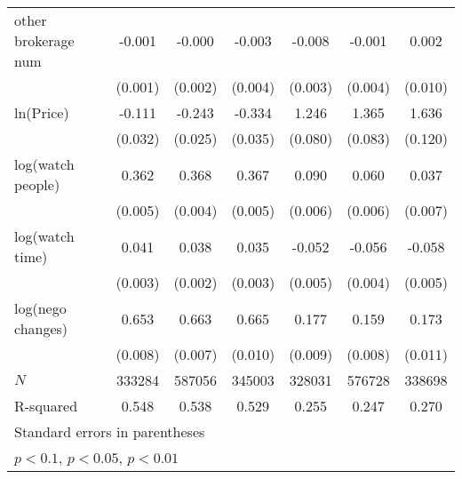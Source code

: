 {\begin{adjustbox}{max width=\textwidth}
\begin{tabular}{l*{6}{c}}
\addlinespace
other brokerage num  &      -0.001         &      -0.000         &      -0.003         &      -0.008\sym{***}&      -0.001         &       0.002         \\
            &     (0.001)         &     (0.002)         &     (0.004)         &     (0.003)         &     (0.004)         &     (0.010)         \\
\addlinespace
ln(Price)&      -0.111\sym{***}&      -0.243\sym{***}&      -0.334\sym{***}&       1.246\sym{***}&       1.365\sym{***}&       1.636\sym{***}\\
            &     (0.032)         &     (0.025)         &     (0.035)         &     (0.080)         &     (0.083)         &     (0.120)         \\
\addlinespace
log(watch people)&       0.362\sym{***}&       0.368\sym{***}&       0.367\sym{***}&       0.090\sym{***}&       0.060\sym{***}&       0.037\sym{***}\\
            &     (0.005)         &     (0.004)         &     (0.005)         &     (0.006)         &     (0.006)         &     (0.007)         \\
\addlinespace
log(watch time)&       0.041\sym{***}&       0.038\sym{***}&       0.035\sym{***}&      -0.052\sym{***}&      -0.056\sym{***}&      -0.058\sym{***}\\
            &     (0.003)         &     (0.002)         &     (0.003)         &     (0.005)         &     (0.004)         &     (0.005)         \\
\addlinespace
log(nego changes)&       0.653\sym{***}&       0.663\sym{***}&       0.665\sym{***}&       0.177\sym{***}&       0.159\sym{***}&       0.173\sym{***}\\
            &     (0.008)         &     (0.007)         &     (0.010)         &     (0.009)         &     (0.008)         &     (0.011)         \\
\midrule
\(N\)       &      333284         &      587056         &      345003         &      328031         &      576728         &      338698         \\
R-squared   &       0.548         &       0.538         &       0.529         &       0.255         &       0.247         &       0.270         \\
\bottomrule
\multicolumn{7}{l}{\footnotesize Standard errors in parentheses}\\
\multicolumn{7}{l}{\footnotesize \sym{*} \(p<0.1\), \sym{**} \(p<0.05\), \sym{***} \(p<0.01\)}\\
\end{tabular}
\end{adjustbox}
}
